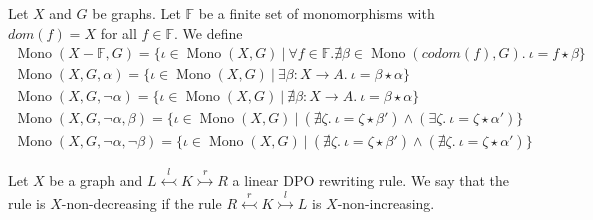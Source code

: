 \begin{remark}[Notation]
    Let $X$ and $G$ be graphs. Let $\mathbb{F}$ be a finite set of monomorphisms with $dom(f) \mathop{=} X$ for all $f \mathop{\in} \mathbb{F}$. We define
    \begin{align*}
        \operatorname{Mono}(X-\mathbb{F},G) \mathop{=} \{ \iota \mathop{\in} \operatorname{Mono}(X,G) \ | \ \forall f \mathop{\in} \mathbb{F}. \nexists \beta \mathop{\in} \operatorname{Mono}(codom(f),G).~\iota \mathop{=} f \mathop{\star} \beta \} 
        \\
        \operatorname{Mono}(X,G,\alpha) \mathop{=} \{ \iota \mathop{\in} \operatorname{Mono}(X,G) \ | \ \exists \beta : X \mathop{\to} A.~\iota \mathop{=} \beta \mathop{\star} \alpha \} 
        \\
        \operatorname{Mono}(X,G,\lnot \alpha) \mathop{=} \{ \iota \mathop{\in} \operatorname{Mono}(X,G) \ | \ \nexists \beta : X \mathop{\to} A.  ~\iota \mathop{=} \beta \mathop{\star} \alpha \} 
        \\
        \operatorname{Mono}(X,G, \lnot \alpha, \beta) \mathop{=} \{ 
            \iota \mathop{\in}  \operatorname{Mono}(X,G) \ | \ (\nexists \zeta. ~\iota \mathop{=} \zeta \mathop{\star} \beta') \mathop{\land} (\exists \zeta.~\iota \mathop{=} \zeta \mathop{\star} \alpha')
        \}
        \\
        \operatorname{Mono}(X,G,\lnot \alpha, \lnot \beta) \mathop{=} \{ 
            \iota \mathop{\in} \operatorname{Mono}(X,G) \ | \ (\nexists \zeta. ~\iota \mathop{=} \zeta \mathop{\star} \beta') \mathop{\land} (\nexists \zeta.~\iota \mathop{=} \zeta \mathop{\star} \alpha')
        \}
        \end{align*}
\end{remark}

\begin{definition}
    Let $X$ be a graph and $L \overset{l}{\leftarrowtail} K \overset{r}{\rightarrowtail} R$ a linear DPO rewriting rule. We say that the rule is $X$-non-decreasing if the rule 
    $R \overset{r}{\leftarrowtail} K \overset{l}{\rightarrowtail} L$ is $X$-non-increasing. 
\end{definition}

